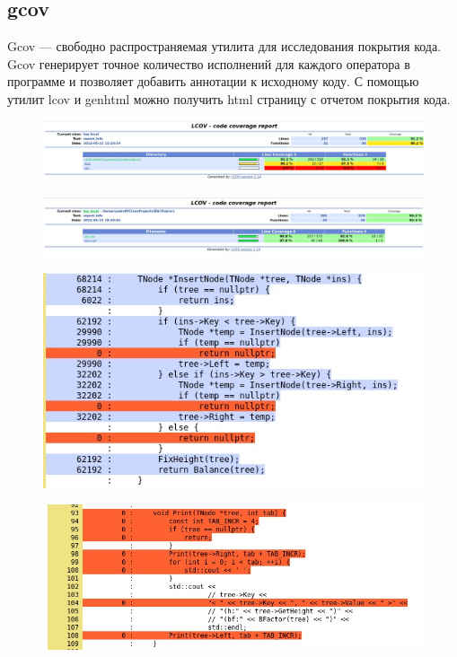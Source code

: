 \documentclass[12pt]{article}
\begin{document}
	\subsection*{gcov}
	
	Gcov — свободно распространяемая утилита для исследования покрытия кода. Gcov генерирует точное количество исполнений для каждого оператора в программе и позволяет добавить аннотации к исходному коду. 
	С помощью утилит lcov и genhtml можно получить html страницу с отчетом покрытия кода.
	\begin{figure}[h]
		\includegraphics[width=\linewidth]{gcov1.jpg}
	\end{figure}
	\begin{figure}[h]
		\includegraphics[width=\linewidth]{gcov2.jpg}
	\end{figure}
	\begin{figure}[h]
		\includegraphics[width=\linewidth]{gcov3.jpg}
	\end{figure}
	\begin{figure}[h]
		\includegraphics[width=\linewidth]{gcov4.jpg}
	\end{figure}
\end{document}
